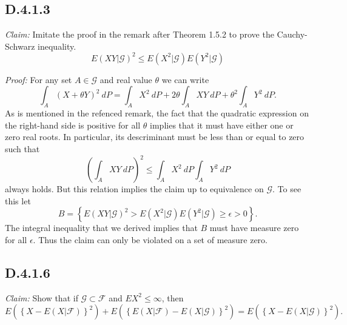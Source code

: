 \documentclass[10pt]{article}
\begin{document}
\subsection*{D.4.1.3}

\textit{Claim:} Imitate the proof in the remark after Theorem 1.5.2
to prove the Cauchy-Schwarz inequality.
\begin{equation*}
  E(XY \vert \mathcal{G})^2 \le E (X^2 \vert \mathcal{G})
  E(Y^2 \vert \mathcal{G})
\end{equation*}

\textit{Proof:} For any set $A \in \mathcal{G}$ and real value $\theta$
we can write
\begin{equation*}
  \int_A (X+\theta Y)^2 \ dP = \int_A X^2 \ dP + 2 \theta \int_A XY \ dP
  + \theta^2 \int_A Y^2 \ dP.
\end{equation*}
As is mentioned in the refenced remark, the fact that the quadratic expression
on the right-hand side is positive for all $\theta$ implies
that it must have either one or zero real roots.
In particular, its descriminant must be less than or equal to zero
such that
\begin{equation*}
  \left(\int_A XY \ dP\right)^2 \le \int_A X^2 \ dP \int_A Y^2 \ dP
\end{equation*} 
always holds. But this relation implies the claim up to equivalence on $\mathcal{G}$.
To see this let
\begin{equation*}
  B = \left\{ E(XY \vert \mathcal{G})^2 > E (X^2 \vert \mathcal{G})
    E(Y^2 \vert \mathcal{G}) \ge \epsilon > 0\right\}.
\end{equation*}
The integral inequality that we derived implies that $B$ must have measure 
zero for all $\epsilon$. Thus the claim can only be violated
on a set of measure zero.

\subsection*{D.4.1.6} 

\textit{Claim:} Show that if $\mathcal{G} \subset \mathcal{F}$
and $EX^2 \le \infty$, then
\begin{equation*}
  E(\left\{X-E(X \vert \mathcal{F})\right\}^2)
  + E(\left\{E(X \vert \mathcal{F}) - E(X \vert \mathcal{G}) \right\}^2)
  = E(\left\{X-E(X \vert \mathcal{G})\right\}^2).
\end{equation*}
\end{document}
